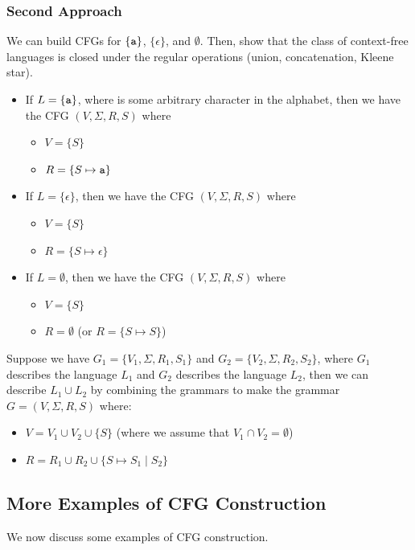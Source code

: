 \documentclass[letterpaper]{article}
\begin{document}
\subsubsection{Second Approach}
We can build CFGs for $\{\texttt{a}\}$, $\{\epsilon\}$, and $\emptyset$. Then, show that the class of context-free languages is closed under the regular operations (union, concatenation, Kleene star). 

\begin{itemize}
    \item If $L = \{\texttt{a}\}$, where  is some arbitrary character in the alphabet, then we have the CFG $(V, \Sigma, R, S)$ where 
    \begin{itemize}
        \item $V = \{S\}$
        \item $R = \{S \mapsto \texttt{a}\}$
    \end{itemize}
    
    \item If $L = \{\epsilon\}$, then we have the CFG $(V, \Sigma, R, S)$ where 
    \begin{itemize}
        \item $V = \{S\}$
        \item $R = \{S \mapsto \epsilon\}$
    \end{itemize}
    
    \item If $L = \emptyset$, then we have the CFG $(V, \Sigma, R, S)$ where 
    \begin{itemize}
        \item $V = \{S\}$
        \item $R =  \emptyset$ (or $R = \{S \mapsto S\}$)
    \end{itemize} 
\end{itemize}
Suppose we have $G_1 = \{V_1, \Sigma, R_1, S_1\}$ and $G_2 = \{V_2, \Sigma, R_2, S_2\}$, where $G_1$ describes the language $L_1$ and $G_2$ describes the language $L_2$, then we can describe $L_1 \cup L_2$ by combining the grammars to make the grammar $G = (V, \Sigma, R, S)$ where:
\begin{itemize}
    \item $V = V_1 \cup V_2 \cup \{S\}$ (where we assume that $V_1 \cap V_2 = \emptyset$)
    \item $R = R_1 \cup R_2 \cup \{S \mapsto S_1 \mid S_2\}$
\end{itemize}

\subsection{More Examples of CFG Construction}
We now discuss some examples of CFG construction.
\end{document}
